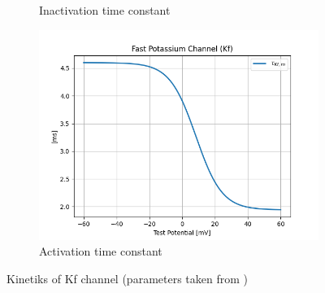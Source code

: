 \documentclass[11pt]{article}
\begin{document}
\begin{figure}[H]
\begin{subfigure}[t]{0.48\textwidth}
        \caption{Inactivation time constant}
        \label{fig_kf_inactivation_time_constant}
    \end{subfigure}
    \hfill
    \begin{subfigure}[t]{0.48\textwidth}
        \centering
        \includegraphics[width=\textwidth]{./img/2025_01_23/Kf_tau_m.png}
        \caption{Activation time constant}
        \label{fig_kf_activation_time_constant}
    \end{subfigure}

    \caption{Kinetiks of Kf channel (parameters taken from \cite{gunayDistalSpikeInitiation2015})}
\end{figure}

\printbibliography
\end{document}
